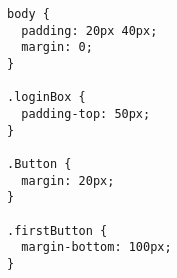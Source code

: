 \begin{verbatim}
body {
  padding: 20px 40px;
  margin: 0;
}

.loginBox {
  padding-top: 50px;
}

.Button {
  margin: 20px;
}

.firstButton {
  margin-bottom: 100px;
}

\end{verbatim}